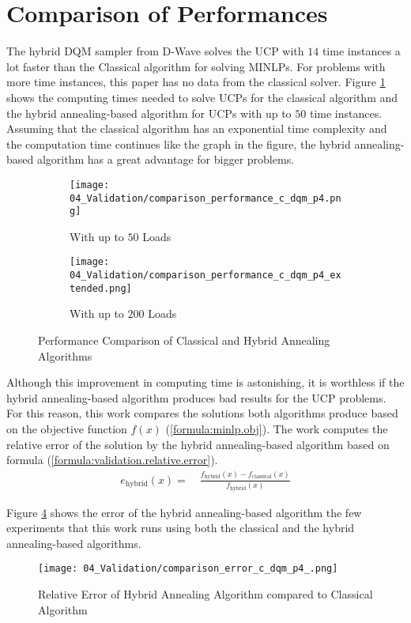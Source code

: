 \section{Comparison of Performances}
\label{validation:comparison}

The hybrid DQM sampler from D-Wave solves the UCP with $14$ time instances a lot faster than the Classical algorithm for solving MINLPs.
For problems with more time instances, this paper has no data from the classical solver.
Figure \ref{figure:validation.comparison.performance} shows the computing times needed to solve UCPs for the classical algorithm and the hybrid annealing-based algorithm for UCPs with up to $50$ time instances.
Assuming that the classical algorithm has an exponential time complexity and the computation time continues like the graph in the figure, the hybrid annealing-based algorithm has a great advantage for bigger problems.

\begin{figure}
  \begin{subfigure}[b]{0.5 \textwidth}
    \centering
    \texttt{[image: 04\_Validation/comparison\_performance\_c\_dqm\_p4.png]}
    \caption{With up to $50$ Loads}
    \label{figure:validation.comparison.performance}
  \end{subfigure}
  \begin{subfigure}[b]{0.5 \textwidth}
    \centering
    \texttt{[image: 04\_Validation/comparison\_performance\_c\_dqm\_p4\_extended.png]}
    \caption{With up to $200$ Loads}
    \label{figure:validation.comparison.performance.extended}
  \end{subfigure}
  \caption{Performance Comparison of Classical and Hybrid Annealing Algorithms}
\end{figure}

Although this improvement in computing time is astonishing, it is worthless if the hybrid annealing-based algorithm produces bad results for the UCP problems.
For this reason, this work compares the solutions both algorithms produce based on the objective function $f(x)$ (\ref{formula:minlp.obj}).
The work computes the relative error of the solution by the hybrid annealing-based algorithm based on formula (\ref{formula:validation.relative.error}).
\begin{align}
  \label{formula:validation.relative.error}
  e_{\text{hybrid}}(x) = \quad \frac{f_{\text{hybrid}}(x) - f_{\text{classical}}(x)}{f_{\text{hybrid}}(x)}
\end{align}

Figure \ref{figure:validation.comparison.error} shows the error of the hybrid annealing-based algorithm the few experiments that this work runs using both the classical and the hybrid annealing-based algorithms.

\begin{figure}
  \centering
  \texttt{[image: 04\_Validation/comparison\_error\_c\_dqm\_p4\_.png]}
  \caption{Relative Error of Hybrid Annealing Algorithm compared to Classical Algorithm}
  \label{figure:validation.comparison.error}
\end{figure}
